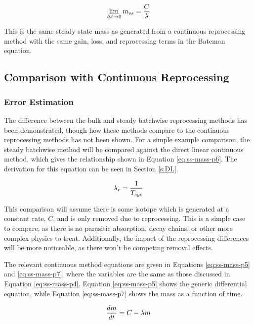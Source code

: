 \begin{equation} \hfill 
\lim_{\Delta t \to 0} m_{ss} = \frac{C}{\lambda}
\hfill\label{eq:ss-mass-limit} \end{equation}

This is the same steady state mass as generated from a continuous reprocessing method with the same gain, loss, and reprocessing terms in the Bateman equation.

\subsection{Comparison with Continuous Reprocessing}
\label{s:batch-cont-compare}

\subsubsection{Error Estimation}

The difference between the bulk and steady batchwise reprocessing methods has been demonstrated, though how these methods compare to the continuous reprocessing methods has not been shown. For a simple example comparison, the steady batchwise method will be compared against the direct linear continuous method, which gives the relationship shown in Equation \eqref{eq:ss-mass-p6}. The derivation for this equation can be seen in Section \ref{s:DL}.

\begin{equation} \hfill 
\lambda_r = \frac{1}{T_{cyc}}
\hfill\label{eq:ss-mass-p6} \end{equation}

This comparison will assume there is some isotope which is generated at a constant rate, $C$, and is only removed due to reprocessing. This is a simple case to compare, as there is no parasitic absorption, decay chains, or other more complex physics to treat. Additionally, the impact of the reprocessing differences will be more noticeable, as there won't be competing removal effects.


The relevant continuous method equations are given in Equations \eqref{eq:ss-mass-p5} and \eqref{eq:ss-mass-p7}, where the variables are the same as those discussed in Equation \eqref{eq:ss-mass-p4}. Equation \eqref{eq:ss-mass-p5} shows the generic differential equation, while Equation \eqref{eq:ss-mass-p7} shows the mass as a function of time.

\begin{equation} \hfill 
\frac{dm}{dt} = C - \lambda m
\hfill\label{eq:ss-mass-p5} \end{equation}


